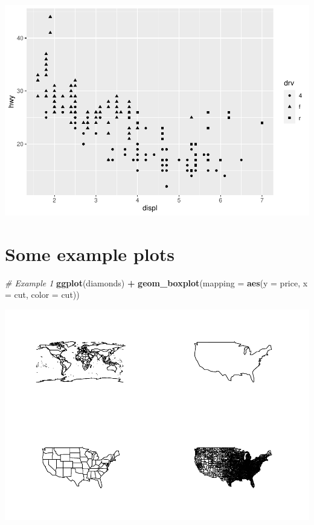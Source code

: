 \documentclass[
]{book}
\newenvironment{Shaded}{\begin{snugshade}}{\end{snugshade}}
\newcommand{\CommentTok}[1]{\textcolor[rgb]{0.56,0.35,0.01}{\textit{#1}}}
\newcommand{\DataTypeTok}[1]{\textcolor[rgb]{0.13,0.29,0.53}{#1}}
\newcommand{\KeywordTok}[1]{\textcolor[rgb]{0.13,0.29,0.53}{\textbf{#1}}}
\newcommand{\NormalTok}[1]{#1}
\newcommand{\OperatorTok}[1]{\textcolor[rgb]{0.81,0.36,0.00}{\textbf{#1}}}
\newcommand{\StringTok}[1]{\textcolor[rgb]{0.31,0.60,0.02}{#1}}
\begin{document}
\includegraphics{_main_files/figure-latex/unnamed-chunk-255-2.pdf}

\hypertarget{some-example-plots}{%
\section{Some example plots}\label{some-example-plots}}

\begin{Shaded}
\begin{Highlighting}[]
\CommentTok{# Example 1}
\KeywordTok{ggplot}\NormalTok{(diamonds) }\OperatorTok{+}\StringTok{ }\KeywordTok{geom_boxplot}\NormalTok{(}\DataTypeTok{mapping =} \KeywordTok{aes}\NormalTok{(}\DataTypeTok{y =}\NormalTok{ price,}
    \DataTypeTok{x =}\NormalTok{ cut, }\DataTypeTok{color =}\NormalTok{ cut))}
\end{Highlighting}
\end{Shaded}

\includegraphics{_main_files/figure-latex/unnamed-chunk-256-1.pdf}
\end{document}
